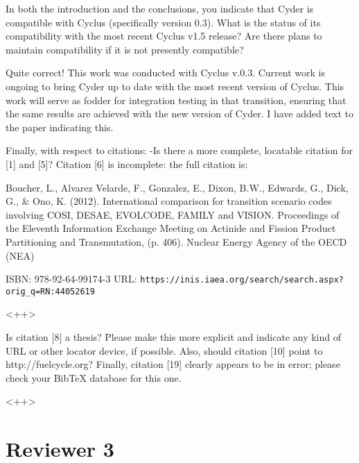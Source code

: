 \documentclass[answers,12pt]{exam}
\begin{document}
\begin{questions}
\question In both the introduction and the conclusions, you indicate that Cyder is compatible with Cyclus (specifically version 0.3). What is the status of its compatibility with the most recent Cyclus v1.5 release? Are there plans to maintain compatibility if it is not presently compatible?
\begin{solution}
Quite correct! This work was conducted with Cyclus v.0.3. Current work is ongoing to 
bring Cyder up to date with the most recent version of Cyclus. This work will 
serve as fodder for integration testing in that transition, ensuring that the 
same results are achieved with the new version of Cyder. I have added text to 
the paper indicating this.
\end{solution}

\question Finally, with respect to citations: 
-Is there a more complete, locatable citation for [1] and [5]? Citation [6] is incomplete: the full citation is:

Boucher, L., Alvarez Velarde, F., Gonzalez, E., Dixon, B.W., Edwards, G., Dick, 
G., \& Ono, K. (2012). International comparison for transition scenario codes involving COSI, DESAE, EVOLCODE, FAMILY and VISION. Proceedings of the Eleventh Information Exchange Meeting on Actinide and Fission Product Partitioning and Transmutation, (p. 406). Nuclear Energy Agency of the OECD (NEA)

ISBN: 978-92-64-99174-3
URL: \verb|https://inis.iaea.org/search/search.aspx?orig_q=RN:44052619|
\begin{solution}
<++>
\end{solution}

\question Is citation [8] a thesis? Please make this more explicit and indicate any kind of URL or other locator device, if possible. Also, should citation [10] point to http://fuelcycle.org? Finally, citation [19] clearly appears to be in error; please check your BibTeX database for this one.
\begin{solution}
<++>
\end{solution}

\section*{Reviewer 3}


\end{questions}
\end{document}
